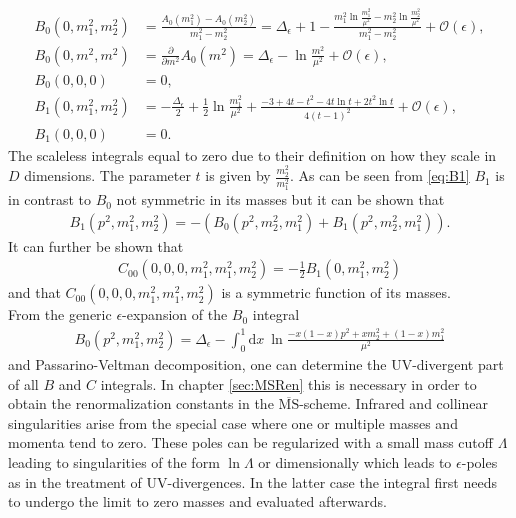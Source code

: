 \begin{align}
B_0(0,m_1^2,m_2^2) &= \frac{A_0(m_1^2)-A_0(m_2^2)}{m_1^2-m_2^2} = \Delta_\epsilon + 1 -\frac{m_1^2\ln \frac{m_1^2}{\mu^2}-m_2^2\ln \frac{m_2^2}{\mu^2}}{m_1^2-m_2^2} + \mathcal{O}(\epsilon),\\
B_0(0,m^2,m^2) &= \frac{\partial}{\partial m^2} A_0(m^2) = \Delta_\epsilon -\ln \frac{m^2}{\mu^2} + \mathcal{O}(\epsilon),\\
B_0(0,0,0) &= 0,\\
B_1(0,m_1^2,m_2^2) &= -\frac{\Delta_\epsilon}{2} + \frac{1}{2}\ln \frac{m_1^2}{\mu^2} + \frac{-3+4t-t^2-4t \ln t +2t^2 \ln t}{4(t-1)^2} + \mathcal{O}(\epsilon),\label{eq:B1}\\
B_1(0,0,0) &= 0.
\end{align}
The scaleless integrals equal to zero due to their definition on how they scale in $D$ dimensions\cite{Collins:105730}. The parameter $t$ is given by $\frac{m_2^2}{m_1^2}$. As can be seen from \ref{eq:B1} $B_1$ is in contrast to $B_0$ not symmetric in its masses but it can be shown\cite{Romao} that
\begin{align}
B_1(p^2,m_1^2,m_2^2) = -(B_0(p^2,m_2^2,m_1^2) + B_1(p^2,m_2^2,m_1^2)).
\end{align}
It can further be shown that
\begin{align}
C_{00}(0,0,0,m_1^2, m_1^2, m_2^2) = -\frac{1}{2}B_1(0, m_1^2, m_2^2)
\end{align} and that $C_{00}(0,0,0,m_1^2, m_1^2, m_2^2)$ is a symmetric function of its masses.\\
From the generic $\epsilon$-expansion of the $B_0$ integral \cite{Denner}
\begin{align}
B_0(p^2,m_1^2,m_2^2) = \Delta_\epsilon - \int_0^1\mathrm{d}x\ \ln \frac{-x(1-x)p^2 + xm_2^2 + (1-x)m_1^2}{\mu^2}
\end{align} 
and Passarino-Veltman decomposition, \cite{Passarino:1978jh} one can determine the UV-divergent part of all $B$ and $C$ integrals. In chapter \ref{sec:MSRen} this is necessary in order to obtain the renormalization constants in the $\overline{\mathrm{MS}}$-scheme. Infrared and collinear singularities arise from the special case where one or multiple masses and momenta tend to zero. These poles can be regularized with a small mass cutoff $\Lambda$ leading to singularities of the form $\ln \Lambda$ or dimensionally which leads to $\epsilon$-poles as in the treatment of UV-divergences. In the latter case the integral first needs to undergo the limit to zero masses and evaluated afterwards.\\
